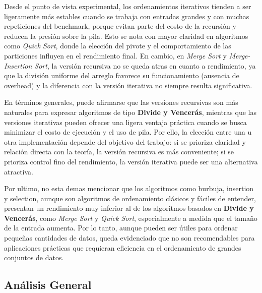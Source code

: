 Desde el punto de vista experimental, los ordenamientos iterativos tienden a ser ligeramente más estables cuando se trabaja con entradas grandes y con muchas repeticiones del benchmark, porque evitan parte del costo de la recursión y reducen la presión sobre la pila.  Esto se nota con mayor claridad en algoritmos como \textit{Quick Sort}, donde la elección del pivote y el comportamiento de las particiones influyen en el rendimiento final.  En cambio, en \textit{Merge Sort} y \textit{Merge-Insertion Sort}, la versión recursiva no se queda atras en cuanto a rendimiento, ya que la división uniforme del arreglo favorece su funcionamiento (ausencia de overhead) y la diferencia con la versión iterativa no siempre resulta significativa.

En términos generales, puede afirmarse que las versiones recursivas son más naturales para expresar algoritmos de tipo \textbf{Divide y Vencerás}, mientras que las versiones iterativas pueden ofrecer una ligera ventaja práctica cuando se busca minimizar el costo de ejecución y el uso de pila.  Por ello, la elección entre una u otra implementación depende del objetivo del trabajo: si se prioriza claridad y relación directa con la teoría, la versión recursiva es más conveniente; si se prioriza control fino del rendimiento, la versión iterativa puede ser una alternativa atractiva.

Por ultimo, no esta demas mencionar que los algoritmos como burbuja, insertion y selection, aunque son algoritmos de ordenamiento clásicos y fáciles de entender, presentan un rendimiento muy inferior al de los algoritmos basados en \textbf{Divide y Vencerás}, como \textit{Merge Sort} y \textit{Quick Sort}, especialmente a medida que el tamaño de la entrada aumenta.  Por lo tanto, aunque pueden ser útiles para ordenar pequeñas cantidades de datos, queda evidenciado que no son recomendables para aplicaciones prácticas que requieran eficiencia en el ordenamiento de grandes conjuntos de datos.

\subsection{Análisis General}

